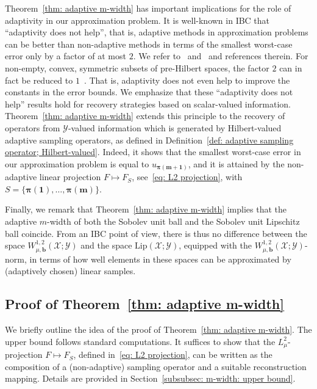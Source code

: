 \documentclass[namedate,webpdf]{ima-authoring-template-blank}
\newcommand*{\Lip}{\mathrm{Lip}}  %
\numberwithin{counter}{section}
\numberwithin{equation}{section}
\theoremstyle{plain}
\theoremstyle{definition}
\newcommand*{\cX}{\mathcal{X}}
\newcommand*{\cY}{\mathcal{Y}}
\theoremstyle{thmstyletwo}
\begin{document}
Theorem~\ref{thm: adaptive m-width} has important implications for the role of adaptivity in our approximation problem. It is well-known in IBC that ``adaptivity does not help'', that is, adaptive methods in approximation problems can be better than non-adaptive methods in terms of the smallest worst-case error only by a factor of at most \(2\).
We refer to~\citet{novak_PowerAdaption_1996} and~\citet{krieg_PowerAdaptionRandomization_2025} and references therein. For non-empty, convex, symmetric subsets of pre-Hilbert spaces, the factor \(2\) can in fact be reduced to \(1\)~\citep[Thm. 4.5]{novak_TractabilityMultivariateProblemsVolume_2008}. That is, adaptivity does not even help to improve the constants in the error bounds. 
We emphasize that these ``adaptivity does not help'' results hold for recovery strategies based on scalar-valued information. Theorem~\ref{thm: adaptive m-width} extends this principle to the recovery of operators from \(\cY\)-valued information which is generated by Hilbert-valued adaptive sampling operators, as defined in Definition~\ref{def: adaptive sampling operator; Hilbert-valued}. Indeed, it shows that the smallest worst-case error in our approximation problem is equal to \( u_{\bm{\pi(m + 1)}} \), and it is attained by the non-adaptive linear projection \( F \mapsto F_S \), see~\eqref{eq: L2 projection}, with \( S = \{ \bm{\pi(1)}, \dots, \bm{\pi(m)} \} \). 

Finally, we remark that Theorem~\ref{thm: adaptive m-width} implies that the adaptive \(m\)-width of both the Sobolev unit ball and the Sobolev unit Lipschitz ball coincide. From an IBC point of view, there is thus no difference between the space \( W_{\mu, \bm{b}}^{1,2}(\cX; \cY) \) and the space \( \Lip(\cX;\cY) \), equipped with the \( W_{\mu, \bm{b}}^{1,2}(\cX; \cY) \)-norm, in terms of how well elements in these spaces can be approximated by (adaptively chosen) linear samples.



\subsection{Proof of Theorem~\ref{thm: adaptive m-width}}

We briefly outline the idea of the proof of Theorem~\ref{thm: adaptive m-width}. The upper bound follows standard computations. It suffices to show that the \(L^2_{\mu}\)-projection \( F \mapsto F_S \), defined in~\eqref{eq: L2 projection}, can be written as the composition of a (non-adaptive) sampling operator and a suitable reconstruction mapping. Details are provided in Section~\ref{subsubsec: m-width: upper bound}. 
\end{document}
